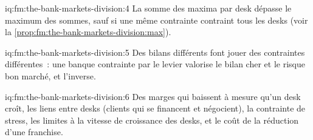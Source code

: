 \begin{solution}{iq:fm:the-bank-markets-division:4}
La somme des maxima par desk dépasse le maximum des sommes, sauf si une même contrainte contraint tous les desks
(voir la \cref{prop:fm:the-bank-markets-division:max}).
\end{solution}

\begin{solution}{iq:fm:the-bank-markets-division:5}
Des bilans différents font jouer des contraintes différentes~: une banque contrainte par le levier valorise le bilan cher et le risque bon marché, et l'inverse.
\end{solution}

\begin{solution}{iq:fm:the-bank-markets-division:6}
Des marges qui baissent à mesure qu'un desk croît, les liens entre desks (clients qui se financent et négocient), la contrainte de stress, les limites à la vitesse de croissance des desks,
et le coût de la réduction d'une franchise.
\end{solution}
